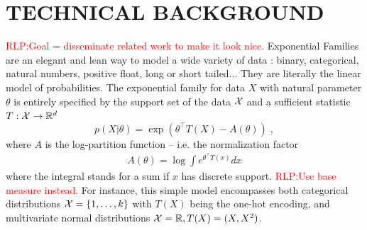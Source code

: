 \documentclass[twoside]{article}
\let\oldsection\section
\renewcommand{\section}[1]{\oldsection{\uppercase{#1}}}
\newcommand{\RLP}[1]{\textcolor{red}{RLP:#1}}
\newcommand{\logpart}{A}
\newcommand{\natp}{\theta}
\begin{document}
\section{Technical background}

\RLP{Goal = disseminate related work to make it look nice.}
Exponential Families are an elegant and lean way to model a wide variety of data : binary, categorical, natural numbers, positive float, long or short tailed... 
They are literally the linear model of probabilities.
The exponential family for data $X$ with natural parameter $\natp$  is entirely specified by the support set of the data   ${\mathcal X}$ and a sufficient statistic $T: {\mathcal X} \rightarrow \mathbb{R}^d$
\begin{equation}
	 p(X|\natp) = \exp( \natp^\top T(X) - \logpart(\natp)) \; ,
\end{equation}
where $\logpart$ is the log-partition function -- i.e. the normalization factor
\begin{align}
    \logpart(\natp) = \log \int e^{\natp^\top T(x)} dx 
\end{align}
where the integral stands for a sum if $x$ has discrete support. \RLP{Use base measure instead.}
For instance, this simple model encompasses both categorical distributions ${\mathcal X} = \{1, \dots, k\}$ with $T(X)$ being the one-hot encoding, and multivariate normal distributions ${\mathcal X}=\mathbb{R}, T(X)=(X, X^2)$. 
\end{document}
